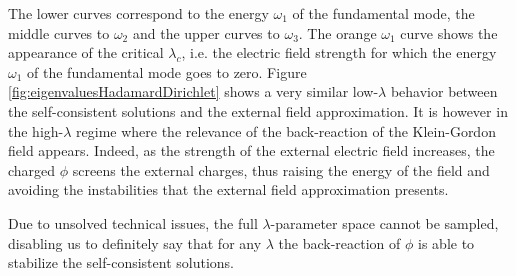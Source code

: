 The lower curves correspond to the energy $\omega_1$ of the fundamental mode, the middle curves to $\omega_2$ and the upper curves to $\omega_3$.
The orange $\omega_1$ curve shows the appearance of the critical $\lambda_c$, i.e. the electric field strength for which the energy $\omega_1$ of the fundamental mode goes to zero. 
Figure \ref{fig:eigenvaluesHadamardDirichlet} shows a very similar low-$\lambda$ behavior between the self-consistent solutions and the external field approximation. It is however in the high-$\lambda$ regime where the relevance of the back-reaction of the Klein-Gordon field appears.
Indeed, as the strength of the external electric field increases, the charged $\phi$ screens the external charges, thus raising the energy of the field and avoiding the instabilities that the external field approximation presents.

Due to unsolved  technical issues, the full $\lambda$-parameter space cannot be sampled, disabling us to definitely say that for any $\lambda$ the back-reaction of $\phi$ is able to stabilize the self-consistent solutions.


